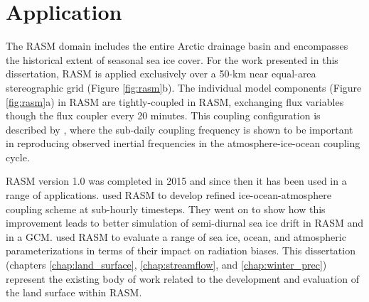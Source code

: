 \section{Application}

The RASM domain includes the entire Arctic drainage basin and encompasses the historical extent of seasonal sea ice cover.
For the work presented in this dissertation, RASM is applied exclusively over a 50-km near equal-area stereographic grid (Figure \ref{fig:rasm}b).
The individual model components (Figure \ref{fig:rasm}a) in RASM are tightly-coupled in RASM, exchanging flux variables though the flux coupler every 20 minutes.
This coupling configuration is described by \citet{Roberts_2015a}, where the sub-daily coupling frequency is shown to be important in reproducing observed inertial frequencies in the atmosphere-ice-ocean coupling cycle.

RASM version 1.0 was completed in 2015 and since then it has been used in a range of applications.
\citet{Roberts_2015a} used RASM to develop refined ice-ocean-atmosphere coupling scheme at sub-hourly timesteps.
They went on to show how this improvement leads to better simulation of semi-diurnal sea ice drift in RASM and in a GCM.
\citet{Cassano_2016} used RASM to evaluate a range of sea ice, ocean, and atmospheric parameterizations in terms of their impact on radiation biases.
This dissertation (chapters \ref{chap:land_surface}, \ref{chap:streamflow}, and \ref{chap:winter_prec}) represent the existing body of work related to the development and evaluation of the land surface within RASM.
